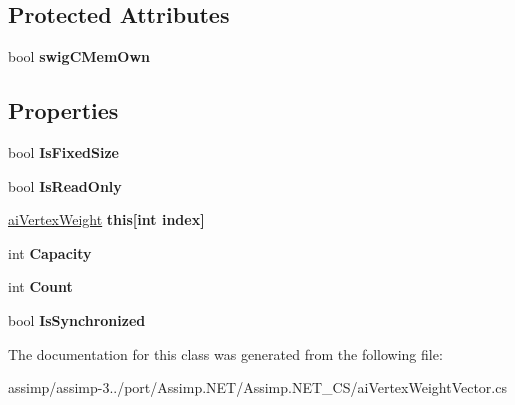 \subsection*{Protected Attributes}
\begin{DoxyCompactItemize}
\item 
\hypertarget{classai_vertex_weight_vector_a9c813e8f5e1d7d079645d9356193f231}{bool {\bfseries swig\+C\+Mem\+Own}}\label{classai_vertex_weight_vector_a9c813e8f5e1d7d079645d9356193f231}

\end{DoxyCompactItemize}
\subsection*{Properties}
\begin{DoxyCompactItemize}
\item 
\hypertarget{classai_vertex_weight_vector_a9dde345f63742d52ca5b01b34a0bf6e3}{bool {\bfseries Is\+Fixed\+Size}}\label{classai_vertex_weight_vector_a9dde345f63742d52ca5b01b34a0bf6e3}

\item 
\hypertarget{classai_vertex_weight_vector_ae329ac2177da3bf7c017432397a4d4f4}{bool {\bfseries Is\+Read\+Only}}\label{classai_vertex_weight_vector_ae329ac2177da3bf7c017432397a4d4f4}

\item 
\hypertarget{classai_vertex_weight_vector_a276e930b655bec7c8b71bbe519ac7552}{\hyperlink{structai_vertex_weight}{ai\+Vertex\+Weight} {\bfseries this\mbox{[}int index\mbox{]}}}\label{classai_vertex_weight_vector_a276e930b655bec7c8b71bbe519ac7552}

\item 
\hypertarget{classai_vertex_weight_vector_a051388b08c2a89b5f20bf27462be8b2c}{int {\bfseries Capacity}}\label{classai_vertex_weight_vector_a051388b08c2a89b5f20bf27462be8b2c}

\item 
\hypertarget{classai_vertex_weight_vector_a0b85f7274104c22d86383079e48a369e}{int {\bfseries Count}}\label{classai_vertex_weight_vector_a0b85f7274104c22d86383079e48a369e}

\item 
\hypertarget{classai_vertex_weight_vector_a954a3baff050ba75d6459cce58c4ab53}{bool {\bfseries Is\+Synchronized}}\label{classai_vertex_weight_vector_a954a3baff050ba75d6459cce58c4ab53}

\end{DoxyCompactItemize}


The documentation for this class was generated from the following file\+:\begin{DoxyCompactItemize}
\item 
assimp/assimp-\/3../port/\+Assimp.\+N\+E\+T/\+Assimp.\+N\+E\+T\+\_\+\+C\+S/ai\+Vertex\+Weight\+Vector.\+cs\end{DoxyCompactItemize}
